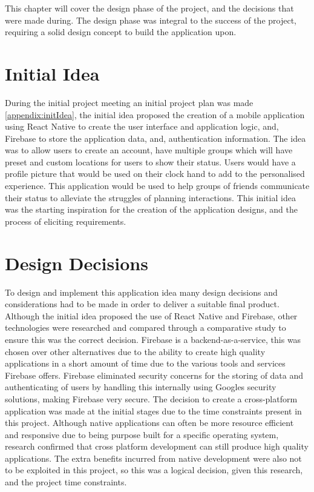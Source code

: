 This chapter will cover the design phase of the project, and the decisions that were made during. The design phase was integral to the success of the project, requiring a solid design concept to build the application upon.

\section{Initial Idea}
During the initial project meeting an initial project plan was made \ref{appendix:initIdea}, the initial idea proposed the creation of a mobile application using React Native \cite{reactnative} to create the user interface and application logic, and, Firebase \cite{firebase} to store the application data, and, authentication information. The idea was to allow users to create an account, have multiple groups which will have preset and custom locations for users to show their status. Users would have a profile picture that would be used on their clock hand to add to the personalised experience. This application would be used to help groups of friends communicate their status to alleviate the struggles of planning interactions. This initial idea was the starting inspiration for the creation of the application designs, and the process of eliciting requirements.

\section{Design Decisions}\label{designDecis}
To design and implement this application idea many design decisions and considerations had to be made in order to deliver a suitable final product. Although the initial idea proposed the use of React Native and Firebase, other technologies were researched and compared through a comparative study \cite{compStudy} to ensure this was the correct decision. Firebase is a backend-as-a-service, this was chosen over other alternatives due to the ability to create high quality applications in a short amount of time due to the various tools and services Firebase offers. Firebase eliminated security concerns for the storing of data and authenticating of users by handling this internally using Googles security solutions, making Firebase very secure. The decision to create a cross-platform application was made at the initial stages due to the time constraints present in this project. Although native applications can often be more resource efficient and responsive due to being purpose built for a specific operating system, research confirmed that cross platform development can still produce high quality applications. The extra benefits incurred from native development were also not to be exploited in this project, so this was a logical decision, given this research, and the project time constraints.

